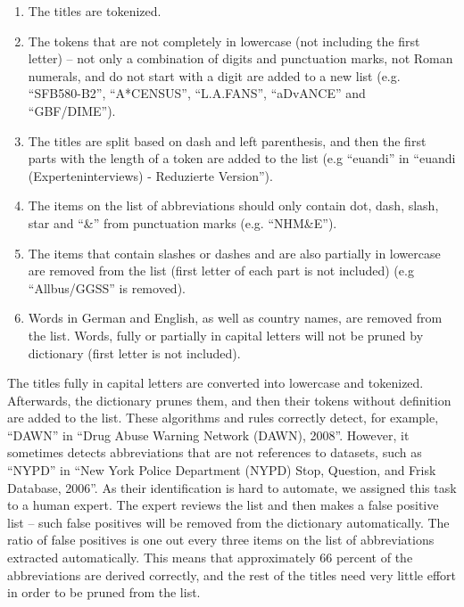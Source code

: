 \documentclass{IOS-Book-Article}
\begin{document}
\begin{enumerate}
	\item The titles are tokenized.
	\item The tokens that are not completely in lowercase (not including the first letter) -- not only a combination of digits and punctuation marks, not Roman numerals, and do not start with a digit are added to a new list (e.g. \enquote{SFB580-B2}, \enquote{A*CENSUS}, \enquote{L.A.FANS}, \enquote{aDvANCE}
	and \enquote{GBF/DIME}).
	\item The titles are split based on dash and left parenthesis, and then the first parts with the length of a token are added to the list (e.g \enquote{euandi} in \enquote{euandi (Experteninterviews) - Reduzierte Version}).
	\item The items on the list of abbreviations should only contain dot, dash, slash, star and \enquote{\&} from punctuation marks (e.g. \enquote{NHM\&E}).
	\item The items that contain slashes or dashes and are also partially in lowercase are removed from the list (first letter of each part is not included) (e.g \enquote{Allbus/GGSS} is removed). 
	\item Words in German and English, as well as country names, are removed from the list. Words, fully or partially in capital letters will not be pruned by dictionary (first letter is not included).
\end{enumerate}
The titles fully in capital letters are converted into lowercase and tokenized. Afterwards, the dictionary prunes them, and then their tokens without definition are added to the list.
These algorithms and rules correctly detect, for example, \enquote{DAWN} in \enquote{Drug Abuse Warning
	Network (DAWN), 2008}. However, it sometimes detects abbreviations that are not references to datasets, such as \enquote{NYPD} in \enquote{New York Police Department (NYPD) Stop, Question, and Frisk Database, 2006}. As their identification is hard to automate, we assigned this task to a human expert. The expert reviews the list and then makes a false positive list -- such false positives will be removed from the dictionary automatically. The ratio of false positives is one out every three items on the list of abbreviations extracted automatically. This means that approximately 66 percent of the abbreviations are derived correctly, and the rest of the titles need very little effort in order to be pruned from the list.
\end{document}
